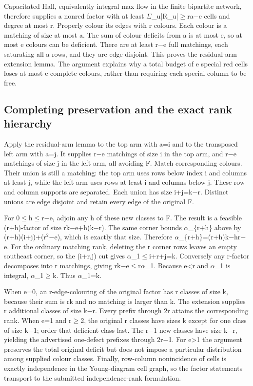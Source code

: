 \documentclass[11pt,a4paper]{article}
\begin{document}
Capacitated Hall, equivalently integral max flow in the finite bipartite network, therefore supplies a nonred factor with at least \ensuremath{\Sigma}\_u|R\_u|\ensuremath{\geq}ra\ensuremath{-}e cells and degree at most r. Properly colour its edges with r colours. Each colour is a matching of size at most a. The sum of colour deficits from a is at most e, so at most e colours can be deficient. There are at least r\ensuremath{-}e full matchings, each saturating all a rows, and they are edge disjoint. This proves the residual-arm extension lemma. The argument explains why a total budget of e special red cells loses at most e complete colours, rather than requiring each special column to be free.

\subsection{Completing preservation and the exact rank hierarchy}
Apply the residual-arm lemma to the top arm with a=i and to the transposed left arm with a=j. It supplies r\ensuremath{-}e matchings of size i in the top arm, and r\ensuremath{-}e matchings of size j in the left arm, all avoiding F. Match corresponding colours. Their union is still a matching: the top arm uses rows below index i and columns at least j, while the left arm uses rows at least i and columns below j. These row and column supports are separated. Each union has size i+j=k\ensuremath{-}r. Distinct unions are edge disjoint and retain every edge of the original F.

For 0\ensuremath{\leq}h\ensuremath{\leq}r\ensuremath{-}e, adjoin any h of these new classes to F. The result is a feasible (r+h)-factor of size rk\ensuremath{-}e+h(k\ensuremath{-}r). The same corner bounds \ensuremath{\alpha}\_\{r+h\} above by (r+h)(i+j)+(r\ensuremath{^2}\ensuremath{-}e), which is exactly that size. Therefore \ensuremath{\alpha}\_\{r+h\}=(r+h)k\ensuremath{-}hr\ensuremath{-}e. For the ordinary matching rank, deleting the r corner rows leaves an empty southeast corner, so the (i+r,j) cut gives \ensuremath{\alpha}\_1\ensuremath{\leq}i+r+j=k. Conversely any r-factor decomposes into r matchings, giving rk\ensuremath{-}e\ensuremath{\leq}r\ensuremath{\alpha}\_1. Because e<r and \ensuremath{\alpha}\_1 is integral, \ensuremath{\alpha}\_1\ensuremath{\geq}k. Thus \ensuremath{\alpha}\_1=k.

When e=0, an r-edge-colouring of the original factor has r classes of size k, because their sum is rk and no matching is larger than k. The extension supplies r additional classes of size k\ensuremath{-}r. Every prefix through 2r attains the corresponding rank. When e=1 and r\ensuremath{\geq}2, the original r classes have sizes k except for one class of size k\ensuremath{-}1; order that deficient class last. The r\ensuremath{-}1 new classes have size k\ensuremath{-}r, yielding the advertised one-defect prefixes through 2r\ensuremath{-}1. For e>1 the argument preserves the total original deficit but does not impose a particular distribution among supplied colour classes. Finally, row-column nonincidence of cells is exactly independence in the Young-diagram cell graph, so the factor statements transport to the submitted independence-rank formulation.
\end{document}
